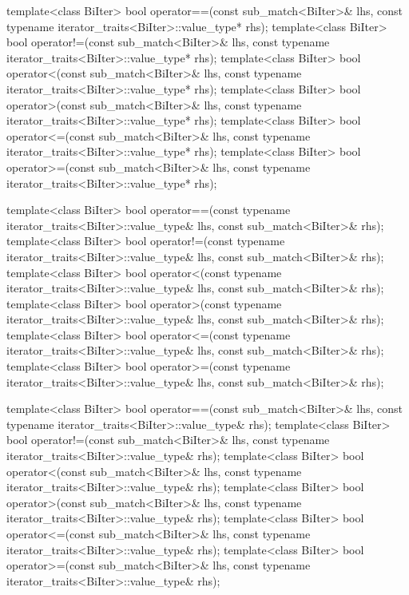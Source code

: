 \begin{codeblock}
{  template<class BiIter>
    bool operator==(const sub_match<BiIter>& lhs,
                    const typename iterator_traits<BiIter>::value_type* rhs);
  template<class BiIter>
    bool operator!=(const sub_match<BiIter>& lhs,
                    const typename iterator_traits<BiIter>::value_type* rhs);
  template<class BiIter>
    bool operator<(const sub_match<BiIter>& lhs,
                   const typename iterator_traits<BiIter>::value_type* rhs);
  template<class BiIter>
    bool operator>(const sub_match<BiIter>& lhs,
                   const typename iterator_traits<BiIter>::value_type* rhs);
  template<class BiIter>
    bool operator<=(const sub_match<BiIter>& lhs,
                    const typename iterator_traits<BiIter>::value_type* rhs);
  template<class BiIter>
    bool operator>=(const sub_match<BiIter>& lhs,
                    const typename iterator_traits<BiIter>::value_type* rhs);

  template<class BiIter>
    bool operator==(const typename iterator_traits<BiIter>::value_type& lhs,
                    const sub_match<BiIter>& rhs);
  template<class BiIter>
    bool operator!=(const typename iterator_traits<BiIter>::value_type& lhs,
                    const sub_match<BiIter>& rhs);
  template<class BiIter>
    bool operator<(const typename iterator_traits<BiIter>::value_type& lhs,
                   const sub_match<BiIter>& rhs);
  template<class BiIter>
    bool operator>(const typename iterator_traits<BiIter>::value_type& lhs,
                   const sub_match<BiIter>& rhs);
  template<class BiIter>
    bool operator<=(const typename iterator_traits<BiIter>::value_type& lhs,
                    const sub_match<BiIter>& rhs);
  template<class BiIter>
    bool operator>=(const typename iterator_traits<BiIter>::value_type& lhs,
                    const sub_match<BiIter>& rhs);

  template<class BiIter>
    bool operator==(const sub_match<BiIter>& lhs,
                    const typename iterator_traits<BiIter>::value_type& rhs);
  template<class BiIter>
    bool operator!=(const sub_match<BiIter>& lhs,
                    const typename iterator_traits<BiIter>::value_type& rhs);
  template<class BiIter>
    bool operator<(const sub_match<BiIter>& lhs,
                   const typename iterator_traits<BiIter>::value_type& rhs);
  template<class BiIter>
    bool operator>(const sub_match<BiIter>& lhs,
                   const typename iterator_traits<BiIter>::value_type& rhs);
  template<class BiIter>
    bool operator<=(const sub_match<BiIter>& lhs,
                    const typename iterator_traits<BiIter>::value_type& rhs);
  template<class BiIter>
    bool operator>=(const sub_match<BiIter>& lhs,
                    const typename iterator_traits<BiIter>::value_type& rhs);

}
\end{codeblock}
